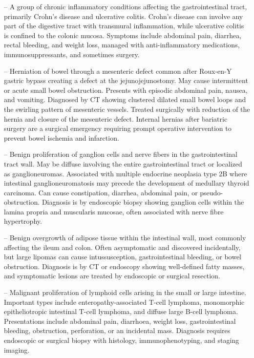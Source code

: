 -- A group of chronic inflammatory conditions affecting the gastrointestinal tract, primarily Crohn's disease and ulcerative colitis. Crohn's disease can involve any part of the digestive tract with transmural inflammation, while ulcerative colitis is confined to the colonic mucosa. Symptoms include abdominal pain, diarrhea, rectal bleeding, and weight loss, managed with anti-inflammatory medications, immunosuppressants, and sometimes surgery.

-- Herniation of bowel through a mesenteric defect common after Roux-en-Y gastric bypass creating a defect at the jejunojejunostomy. May cause intermittent or acute small bowel obstruction. Presents with episodic abdominal pain, nausea, and vomiting. Diagnosed by CT showing clustered dilated small bowel loops and the swirling pattern of mesenteric vessels. Treated surgically with reduction of the hernia and closure of the mesenteric defect. Internal hernias after bariatric surgery are a surgical emergency requiring prompt operative intervention to prevent bowel ischemia and infarction.

-- Benign proliferation of ganglion cells and nerve fibers in the gastrointestinal tract wall. May be diffuse involving the entire gastrointestinal tract or localized as ganglioneuromas. Associated with multiple endocrine neoplasia type 2B where intestinal ganglioneuromatosis may precede the development of medullary thyroid carcinoma. Can cause constipation, diarrhea, abdominal pain, or pseudo-obstruction. Diagnosis is by endoscopic biopsy showing ganglion cells within the lamina propria and muscularis mucosae, often associated with nerve fibre hypertrophy.

-- Benign overgrowth of adipose tissue within the intestinal wall, most commonly affecting the ileum and colon. Often asymptomatic and discovered incidentally, but large lipomas can cause intussusception, gastrointestinal bleeding, or bowel obstruction. Diagnosis is by CT or endoscopy showing well-defined fatty masses, and symptomatic lesions are treated by endoscopic or surgical resection.

-- Malignant proliferation of lymphoid cells arising in the small or large intestine. Important types include enteropathy-associated T-cell lymphoma, monomorphic epitheliotropic intestinal T-cell lymphoma, and diffuse large B-cell lymphoma. Presentations include abdominal pain, diarrhoea, weight loss, gastrointestinal bleeding, obstruction, perforation, or an incidental mass. Diagnosis requires endoscopic or surgical biopsy with histology, immunophenotyping, and staging imaging.


